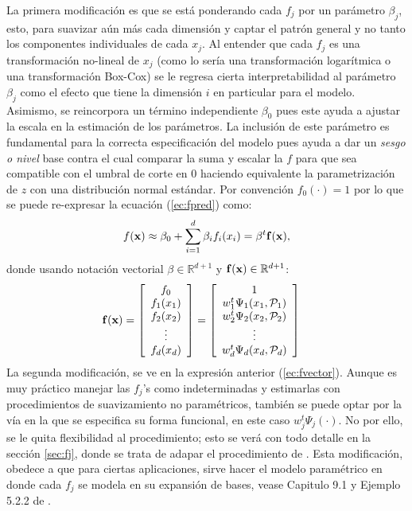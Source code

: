 \documentclass[../Main/Main.tex]{subfiles}
\begin{document}
La primera modificación es que se está ponderando cada $f_j$ por un parámetro $\beta_j$, esto, para suavizar aún más cada dimensión y captar el patrón general y no tanto los componentes individuales de cada $x_j$. Al entender que cada $f_j$ es una transformación no-lineal de $x_j$ (como lo sería una transformación logarítmica o una transformación Box-Cox) se le regresa cierta interpretabilidad al parámetro $\beta_j$ como el efecto que tiene la dimensión $i$ en particular para el modelo. Asimismo, se reincorpora un término independiente $\beta_0$ pues este ayuda a ajustar la escala en la estimación de los parámetros. La inclusión de este parámetro es fundamental para la correcta especificación del modelo pues ayuda a dar un \textit{sesgo o nivel} base contra el cual comparar la suma y escalar la $f$ para que sea compatible con el umbral de corte en $0$ haciendo equivalente la parametrización de $z$ con una distribución normal estándar. Por convención $f_0(\cdot) = 1$ por lo que se puede re-expresar la ecuación (\ref{ec:fpred}) como:
$$
f(\mathbf{x}) \approx \beta_0 +\sum_{i=1}^d \beta_i f_i(x_i) = \beta^t \mathbf{f}(\mathbf{x}),
$$
donde usando notación vectorial $\beta\in\mathbb{R}^{d+1}$ y 
$\mathbf{f}(\mathbf{x}) \in\mathbb{R}^{d+1}$:
\begin{align}\label{ec:fvector}
\mathbf{f}(\mathbf{x}) &=  
\left[
	\begin{array}{c} 
	f_0 \\
	f_1(x_1) \\
	f_2(x_2) \\
	\vdots   \\
	f_d(x_d)
	\end{array}
\right]
	=
\left[
	\begin{array}{c} 
	1 \\
 	w_1^t\Psi_1(x_1,\mathcal{P}_1)\\
 	w_2^t\Psi_2(x_2,\mathcal{P}_2)\\
	\vdots   \\
 	w_d^t\Psi_d(x_d,\mathcal{P}_d)\\
	\end{array}
\right]	
\end{align} 
La segunda modificación, se ve en la expresión anterior (\ref{ec:fvector}). Aunque es muy práctico manejar las $f_j$'s como indeterminadas y estimarlas con procedimientos de suavizamiento no paramétricos, también se puede optar por la vía en la que se especifica su forma funcional, en este caso $w_j^t\Psi_j(\cdot)$.
No por ello, se le quita flexibilidad al procedimiento; esto se verá con todo detalle en la sección \ref{sec:fj}, donde se trata de adapar el procedimiento de \citet{mallik1998automatic}. Esta modificación, obedece a que para ciertas aplicaciones, sirve hacer el modelo paramétrico en donde cada $f_j$ se modela en su expansión de bases, vease Capitulo 9.1 y Ejemplo 5.2.2 de \citet{hastie2008elements}.
\end{document}
